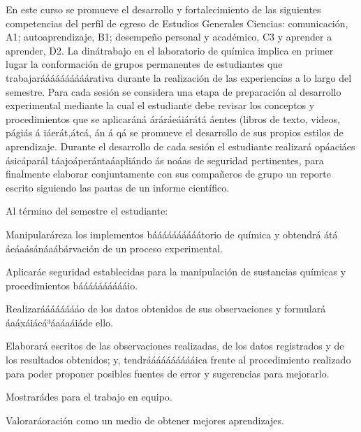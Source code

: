 \begin{syllabus}


\begin{justification}
En este curso se promueve el desarrollo y fortalecimiento de las siguientes competencias del perfil de egreso de Estudios Generales Ciencias: comunicación, A1; autoaprendizaje, B1; desempeño personal y académico, C3 y aprender a aprender, D2. La dinátrabajo en el laboratorio de química implica en primer lugar la conformación de grupos permanentes de estudiantes que trabajaráááááááááárativa durante la realización de las experiencias a lo largo del semestre. Para cada sesión se considera una etapa de preparación al desarrollo experimental mediante la cual el estudiante debe revisar los conceptos y procedimientos que se aplicaráná áráráeáiárátá áentes (libros de texto, videos, págiás á iáerát,átcá, án á qá se promueve el desarrollo de sus propios estilos de aprendizaje. Durante el desarrollo de cada sesión el estudiante realizará opáaciáes ásicáparál táajoáperántaáapliándo ás noáas de seguridad pertinentes, para finalmente elaborar conjuntamente con sus compañeros de grupo un reporte escrito siguiendo las pautas de un informe científico.

Al término del semestre el estudiante:
\end{justification}

\begin{goals}

\item Manipularáreza los implementos báááááááááátorio de química y obtendrá átá áeáaásánáaábárvación de un proceso experimental. 
\item Aplicaráe seguridad establecidas para la manipulación de sustancias químicas y procedimientos bááááááááááio.
\item Realizarááááááááo de los datos obtenidos de sus observaciones y formulará áaáxáiácá³áaáaáiáde ello.
\item Elaborará escritos de las observaciones realizadas, de los datos registrados y de los resultados obtenidos; y, tendrááááááááááica frente al procedimiento realizado para poder proponer posibles fuentes de error y sugerencias para mejorarlo. 
\item Mostrarádes para el trabajo en equipo.
\item Valoraráoración como un medio de obtener mejores aprendizajes.
\end{goals}


\end{syllabus}
